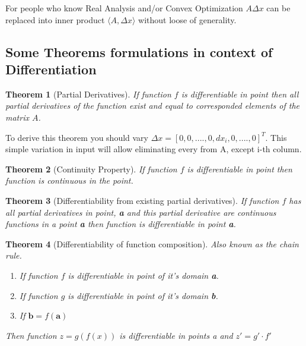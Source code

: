 \documentclass[12pt,a4paper]{article}
\theoremstyle{plain}
\newtheorem{theorem}{Theorem}[section]
\begin{document}
For people who know Real Analysis and/or Convex Optimization $A \varDelta x$ can be replaced into inner product $\langle A, \varDelta x \rangle$ without loose of generality.

\subsection{Some Theorems formulations in context of Differentiation}
\begin{theorem} [Partial Derivatives]
 If function $f$ is differentiable in point then all partial derivatives of the function exist and equal to corresponded elements of the matrix $A$.
\end{theorem}
To derive this theorem you should vary \textbf{$\varDelta x = [0, 0, ...., 0, dx_i, 0, ...., 0]^T$}.
This simple variation in input will allow eliminating every from A, except i-th column.
\begin{theorem} [Continuity Property]
 If function $f$ is differentiable in point then function is continuous in the point.
\end{theorem}
\begin{theorem} [Differentiability from existing partial derivatives]
 If function $f$ has all partial derivatives in point, \textbf{a} and this partial derivative are continuous functions in a point \textbf{a} then function is differentiable in point \textbf{a}.
\end{theorem}
\begin{theorem} [Differentiability of function composition] Also known as the chain rule.
 \begin{enumerate}
  \item  If function $f$ is differentiable in point of it’s domain \textbf{a}.
  \item  If function $g$ is differentiable in point of it’s domain \textbf{b}.
  \item  If $\textbf{b} = f(\textbf{a})$
 \end{enumerate}
 Then function $z=g(f(x))$ is differentiable in points \textit{a} and 
 $z' = g' \cdot f'$
\end{theorem}
\end{document}

